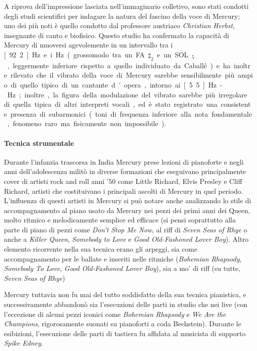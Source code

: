 \documentclass[12pt]{article}
\begin{document}
A riprova dell'impressione lasciata nell'immaginario colletivo, sono stati condotti degli studi scientifici per indagare la natura del fascino della voce di Mercury; uno dei più noti è quello condotto dal professore austriaco \emph{Christian Herbst}, insegnante di canto e biofisico. Questo studio ha confermato la capacità di Mercury di muoversi agevolemente in un intervallo tra i \unit[92.2]{Hz} e i \unit[784]{Hz} (grossomodo tra un FA\(\sharp_{2}\) e un SOL\(_{5}\), leggermente inferiore rispetto a quello individuato da Caballé) e ha inoltre rilevato che il vibrato della voce di Mercury sarebbe sensibilmente più ampio di quello tipico di un cantante d'opera, intorno ai \unit[5.5]{Hz}-\unit[6]{Hz}; inoltre, la figura della modulazione del vibrato sarebbe più irregolare di quella tipica di altri interpreti vocali, ed è stato registrato una consistente presenza di subarmonici (toni di frequenza inferiore alla nota fondamentale, fenomeno raro ma fisicamente non impossibile).

\paragraph{Tecnica strumentale} Durante l'infanzia trascorsa in India Mercury prese lezioni di pianoforte e negli anni dell'adolescenza militò in diverse formazioni che eseguivano principalmente cover di artisti rock and roll anni '\(50\) come Little Richard, Elvis Presley e Cliff Richard, artisti che costituivano i principali ascolti di Mercury in quel periodo. L'influenza di questi artisti in Mercury si può notare anche analizzando lo stile di accompagnamento al piano usato da Mercury nei pezzi dei primi anni dei Queen, molto ritmico e melodicamente semplice ed efficace (si pensi soprattutto alla parte di piano di pezzi come \emph{Don't Stop Me Now}, al riff di \emph{Seven Seas of Rhye} o anche a \emph{Killer Queen}, \emph{Somebody to Love} e \emph{Good Old-Fashoned Lover Boy}). Altro elemento ricorrente nella sua tecnica erano gli arpeggi, sia come accompagnamento per le ballate e inseriti nelle ritmiche (\emph{Bohemian Rhapsody}, \emph{Somebody To Love}, \emph{Good Old-Fashoned Lover Boy}), sia a mo' di riff (su tutte, \emph{Seven Seas of Rhye})

Mercury tuttavia non fu mai del tutto soddisfatto della sua tecnica pianistica, e successivamente abbandonò sia l'esecuzioni delle parti in studio che nei live (con l'eccezione di alcuni pezzi iconici come \emph{Bohemian Rhapsody} e \emph{We Are the Champions}, rigorosamente suonati su pianoforti a coda Bechstein). Durante le esibizioni, l'esecuzione delle parti di tastiera fu affidata al musicista di supporto \emph{Spike Edney}.
\end{document}

